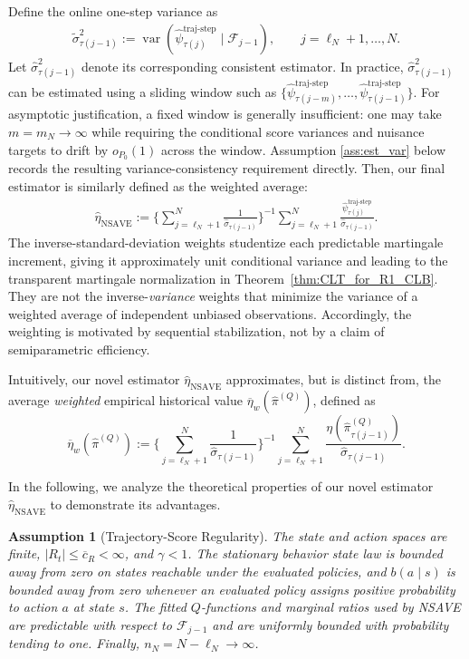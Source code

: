 \documentclass[12pt]{article}
\newtheorem{assumption}{Assumption}
\theoremstyle{remark}\newtheorem{remark}[theorem]{Remark}\theoremstyle{plain}
\newcommand{\EstestFunTraj}{\widehat{\psi}^{\text{traj-step}}}
\newcommand{\var}{\operatorname{var}}
\begin{document}
Define the online one-step variance as 
\[
    \begin{aligned}
        \widetilde{\sigma}_{\tau(j - 1)}^2
        :=\var\!\left(
        \EstestFunTraj_{\tau(j)}
        \mid\mathcal F_{j-1}\right),
        \qquad j=\ell_N+1,\ldots,N.
    \end{aligned}
\]
Let $\widehat{\sigma}_{\tau(j - 1)}^2$ denote its corresponding consistent estimator. 
In practice, $\widehat{\sigma}_{\tau(j - 1)}^2$ can be estimated using
a sliding window such as
$\{\EstestFunTraj_{\tau(j-m)},\ldots,
\EstestFunTraj_{\tau(j-1)}\}$.  For asymptotic justification, a fixed
window is generally insufficient: one may take $m=m_N\to\infty$ while
requiring the conditional score variances and nuisance targets to
drift by $o_{P_0}(1)$ across the window.  Assumption
\ref{ass:est_var} below records the resulting variance-consistency
requirement directly.
Then, our final estimator is similarly defined as the weighted average:
\[
    \begin{aligned}
        \widehat{\eta}_{\text{NSAVE}} := \bigg\{ \sum_{j = \ell_N + 1}^N \frac{1}{\widehat{\sigma}_{\tau(j - 1)}}\bigg\}^{-1} \sum_{j = \ell_N + 1}^N \frac{\EstestFunTraj_{\tau(j)}}{\widehat{\sigma}_{\tau(j - 1)}}.
    \end{aligned}
\]
The inverse-standard-deviation weights studentize each predictable
martingale increment, giving it approximately unit conditional
variance and leading to the transparent martingale normalization in
Theorem~\ref{thm:CLT_for_R1_CLB}.  They are not the
inverse-\emph{variance} weights that minimize the variance of a
weighted average of independent unbiased observations.  Accordingly,
the weighting is motivated by sequential stabilization, not by a
claim of semiparametric efficiency.%


Intuitively, our novel estimator $\widehat{\eta}_{\text{NSAVE}}$ approximates, but is distinct from, the average \textit{weighted} empirical historical value $\overline{\eta}_w(\widehat{\pi}^{(Q)})$, defined as
\[
    \overline{\eta}_{w}(\widehat{\pi}^{(Q)})
    :=
    \bigg\{\sum_{j=\ell_N+1}^N
    \frac{1}{\widehat{\sigma}_{\tau(j-1)}}\bigg\}^{-1}
    \sum_{j=\ell_N+1}^N
    \frac{\eta(\widehat{\pi}_{\tau(j-1)}^{(Q)})}
    {\widehat{\sigma}_{\tau(j-1)}}.
\]

In the following, we analyze the theoretical properties of our novel estimator $\widehat{\eta}_{\text{NSAVE}}$ to demonstrate its advantages.
\begin{assumption}[Trajectory-Score Regularity]
\label{ass:traj_score_reg}
    The state and action spaces are finite,
    $|R_t|\leq\overline c_R<\infty$, and $\gamma<1$.  The stationary
    behavior state law is
    bounded away from zero on states reachable under the evaluated
    policies, and $b(a\mid s)$ is bounded away from zero whenever an
    evaluated policy assigns positive probability to action $a$ at
    state $s$.  The fitted $Q$-functions and
    marginal ratios used by NSAVE are predictable with respect to
    $\mathcal F_{j-1}$ and are uniformly bounded with probability
    tending to one.  Finally, $n_N=N-\ell_N\to\infty$.
\end{assumption}
\end{document}
